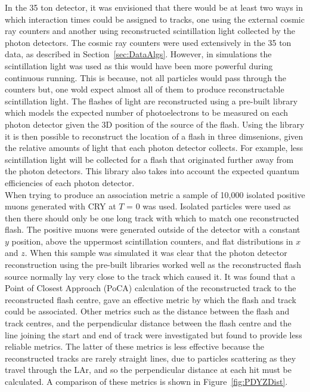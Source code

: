 In the 35 ton detector, it was envisioned that there would be at least two ways in which interaction times could be assigned to tracks, one using the external cosmic ray counters and another using reconstructed scintillation light collected by the photon detectors. The cosmic ray counters were used extensively in the 35 ton data, as described in Section~\ref{sec:DataAlgs}. However, in simulations the scintillation light was used as this would have been more powerful during continuous running. This is because, not all particles would pass through the counters but, one wold expect almost all of them to produce reconstructable scintillation light. The flashes of light are reconstructed using a pre-built library which models the expected number of photoelectrons to be measured on each photon detector given the 3D position of the source of the flash. Using the library it is then possible to reconstruct the location of a flash in three dimsenions, given the relative amounts of light that each photon detector collects. For example, less scintillation light will be collected for a flash that originated further away from the photon detectors. This library also takes into account the expected quantum efficiencies of each photon detector. \\

When trying to produce an association metric a sample of 10,000 isolated positive muons generated with CRY at $T$ = 0 was used. Isolated particles were used as then there should only be one long track with which to match one reconstructed flash. The positive muons were generated outside of the detector with a constant $y$ position, above the uppermost scintillation counters, and flat distributions in $x$ and $z$. When this sample was simulated it was clear that the photon detector reconstruction using the pre-built libraries worked well as the reconstructed flash source normally lay very close to the track which caused it. It was found that a Point of Closest Approach (PoCA) calculation of the reconstructed track to the reconstructed flash centre, gave an effective metric by which the flash and track could be associated. Other metrics such as the distance between the flash and track centres, and the perpendicular distance between the flash centre and the line joining the start and end of track were investigated but found to provide less reliable metrics. The latter of these metrics is less effective because the reconstructed tracks are rarely straight lines, due to particles scattering as they travel through the LAr, and so the perpendicular distance at each hit must be calculated. A comparison of these metrics is shown in Figure~\ref{fig:PDYZDist}. \\

